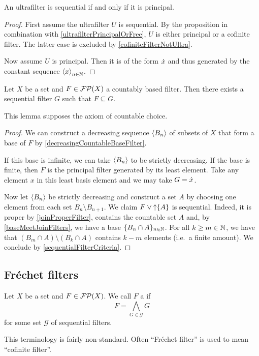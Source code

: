\begin{corollary}
An ultrafilter is sequential \textup{if and only if} it is principal.
\end{corollary}
\begin{proof}
First assume the ultrafilter $U$ is sequential. By the proposition in combination with \ref{ultrafilterPrincipalOrFree}, $U$ is either principal or a cofinite filter. The latter case is excluded by \ref{cofiniteFilterNotUltra}.

Now assume $U$ is principal. Then it is of the form $\dot{x}$ and thus generated by the constant sequence $\left\langle x \right\rangle_{n\in \mathbb{N}}$.
\end{proof}

\begin{lemma} \label{countablyBasedFilterHasFinerSequential}
Let $X$ be a set and $F\in\operatorname{\mathcal{FP}}(X)$ a countably based filter. Then there exists a sequential filter $G$ such that $F\subseteq G$.
\end{lemma}
This lemma supposes the axiom of countable choice.
\begin{proof}
We can construct a decreasing sequence $\left\langle B_n \right\rangle$ of subsets of $X$ that form a base of $F$ by \ref{decreasingCountableBaseFilter}.

If this base is infinite, we can take $\left\langle B_n \right\rangle$ to be strictly decreasing. If the base is finite, then $F$ is the principal filter generated by its least element. Take any element $x$ in this least basis element and we may take $G = \dot{x}$.

Now let $\left\langle B_n \right\rangle$ be strictly decreasing and construct a set $A$ by choosing one element from each set $B_n\setminus B_{n+1}$. We claim $F\vee \operatorname{\uparrow}\{A\}$ is sequential. Indeed, it is proper by \ref{joinProperFilter}, contains the countable set $A$ and, by \ref{baseMeetJoinFilters}, we have a base $\{B_n\cap A\}_{n\in \mathbb{N}}$. 
For all $k\geq m\in \mathbb{N}$, we have that $(B_m\cap A)\setminus (B_k\cap A)$ contains $k-m$ elements (i.e.\ a finite amount).
We conclude by \ref{sequentialFilterCriteria}.
\end{proof}

\subsection{Fréchet filters}
\begin{definition}
Let $X$ be a set and $F\in\operatorname{\mathcal{FP}}(X)$. We call $F$ a  if
\[ F = \bigwedge_{G\in \mathcal{G}}G \]
for some set $\mathcal{G}$ of sequential filters.
\end{definition}
This terminology is fairly non-standard. Often ``Fréchet filter'' is used to mean ``cofinite filter''.

